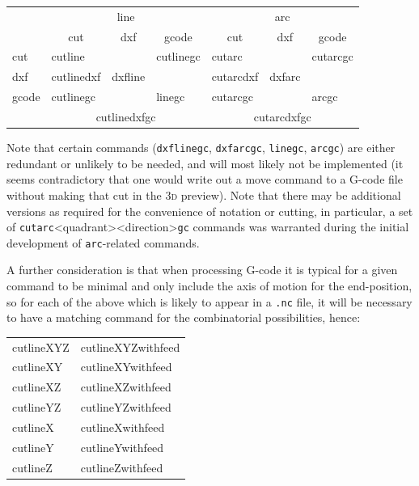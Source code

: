 \documentclass{ltxdoc}
\begin{document}
\begin{center}
\noindent\begin{tabular}{lllllll}\toprule
& \multicolumn{3}{c}{line} & \multicolumn{3}{c}{arc}
\\\cmidrule(lr){2-4}\cmidrule(lr){5-7}
      & \multicolumn{1}{c}{cut}& \multicolumn{1}{c}{dxf}& \multicolumn{1}{c}{gcode}& \multicolumn{1}{c}{cut}& \multicolumn{1}{c}{dxf}& \multicolumn{1}{c}{gcode}\\\midrule
cut   & cutline\hphantom{dxf}  &                        &  cutlinegc               & cutarc\hphantom{dxf}   &                        & cutarcgc            \\
dxf   & cutlinedxf             & dxfline\hphantom{gc}   &                          & cutarcdxf              & dxfarc\hphantom{gc}    &                     \\
gcode & cutlinegc              & \hphantom{dxflinegc}   & linegc\hphantom{cut}     & cutarcgc               & \hphantom{dxfarcgc}    & arcgc\hphantom{cut} \\\cmidrule(ll){2-4}\cmidrule(ll){5-7}
& \multicolumn{3}{c}{cutlinedxfgc}                                         & \multicolumn{3}{c}{cutarcdxfgc}\\\bottomrule
\end{tabular}
\end{center}

\noindent Note that certain commands (\verb|dxflinegc|, \verb|dxfarcgc|, \verb|linegc|, \verb|arcgc|) are either redundant or unlikely to be needed, and will most likely not be implemented (it seems contradictory that one would write out a move command to a G-code file without making that cut in the \textsc{3d} preview). Note that there may be additional versions as required for the convenience of notation or cutting, in particular, a set of \verb|cutarc|<quadrant><direction>\verb|gc| commands was warranted during the initial development of \verb|arc|-related commands.

A further consideration is that when processing G-code it is typical for a given command to be minimal and only include the axis of motion for the end-position, so for each of the above which is likely to appear in a \verb|.nc| file, it will be necessary to have a matching command for the combinatorial possibilities, hence:

\begin{center}
\noindent\begin{tabular}{ll}\toprule
cutlineXYZ  & cutlineXYZwithfeed\\
cutlineXY   & cutlineXYwithfeed\\
cutlineXZ  & cutlineXZwithfeed\\
cutlineYZ   & cutlineYZwithfeed\\
cutlineX   & cutlineXwithfeed\\
cutlineY   & cutlineYwithfeed\\
cutlineZ   & cutlineZwithfeed\\\bottomrule
\end{tabular}
\end{center}
\end{document}
